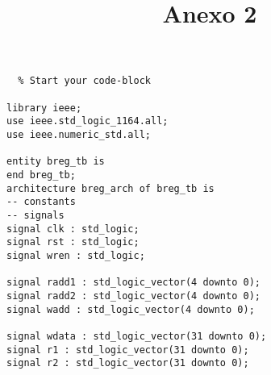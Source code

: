 \documentclass[a4paper]{article}
\title{Anexo 2}
\begin{document}
\lstset{language=VHDL}          %
\maketitle
\begin{lstlisting}  % Start your code-block

library ieee;         
use ieee.std_logic_1164.all;
use ieee.numeric_std.all;

entity breg_tb is
end breg_tb;
architecture breg_arch of breg_tb is
-- constants
-- signals
signal clk : std_logic;
signal rst : std_logic;
signal wren : std_logic;

signal radd1 : std_logic_vector(4 downto 0);
signal radd2 : std_logic_vector(4 downto 0);
signal wadd : std_logic_vector(4 downto 0);

signal wdata : std_logic_vector(31 downto 0);
signal r1 : std_logic_vector(31 downto 0);
signal r2 : std_logic_vector(31 downto 0);


\end{lstlisting}
\end{document}
